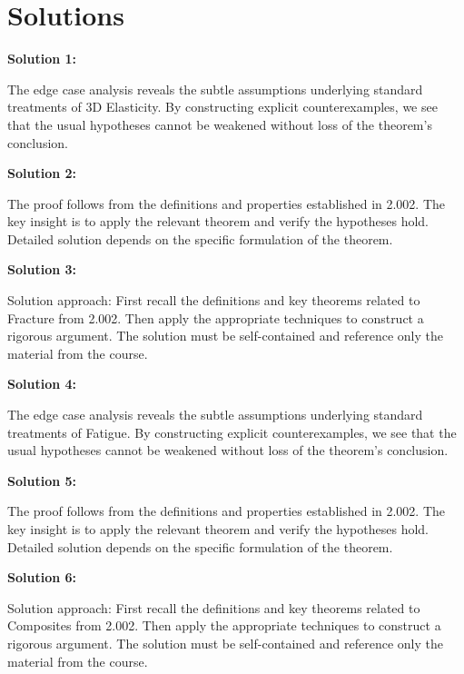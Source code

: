 \documentclass[12pt,a4paper]{exam}
\begin{document}
\newpage
\section*{Solutions}

\textbf{Solution 1:}

The edge case analysis reveals the subtle assumptions underlying standard treatments of 3D Elasticity. By constructing explicit counterexamples, we see that the usual hypotheses cannot be weakened without loss of the theorem's conclusion.

\vspace{0.5cm}

\textbf{Solution 2:}

The proof follows from the definitions and properties established in 2.002. The key insight is to apply the relevant theorem and verify the hypotheses hold. Detailed solution depends on the specific formulation of the theorem.

\vspace{0.5cm}

\textbf{Solution 3:}

Solution approach: First recall the definitions and key theorems related to Fracture from 2.002. Then apply the appropriate techniques to construct a rigorous argument. The solution must be self-contained and reference only the material from the course.

\vspace{0.5cm}

\textbf{Solution 4:}

The edge case analysis reveals the subtle assumptions underlying standard treatments of Fatigue. By constructing explicit counterexamples, we see that the usual hypotheses cannot be weakened without loss of the theorem's conclusion.

\vspace{0.5cm}

\textbf{Solution 5:}

The proof follows from the definitions and properties established in 2.002. The key insight is to apply the relevant theorem and verify the hypotheses hold. Detailed solution depends on the specific formulation of the theorem.

\vspace{0.5cm}

\textbf{Solution 6:}

Solution approach: First recall the definitions and key theorems related to Composites from 2.002. Then apply the appropriate techniques to construct a rigorous argument. The solution must be self-contained and reference only the material from the course.
\end{document}
